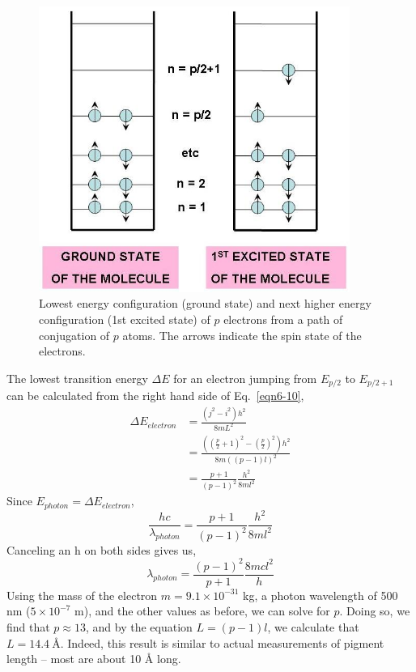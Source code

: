 \begin{figure}[h]
	\centering
	\includegraphics[width=4.0in]{./figures/Topic6/Fig6-6.jpg}
	\caption{Lowest energy configuration (ground state) and next higher energy configuration (1st excited state) of $p$ electrons from a path of conjugation of $p$ atoms. The arrows indicate the spin state of the electrons.}
	\label{Fig6-6}
\end{figure}

The lowest transition energy $\Delta E$ for an electron jumping from $E_{p/2}$ to $E_{p/2+1}$ can be calculated from the right hand side of Eq.~\ref{eqn6-10},      
\begin{align}
\Delta E_{electron}&=\frac{\left(j^2-i^2\right)h^2}{8mL^2}\nonumber\\
				&=\frac{\left(\left(\frac{p}{2}+1\right)^2-\left(\frac{p}{2}\right)^2\right)h^2}{8m\left(\left(p-1\right)l\right)^2}\nonumber\\
				&=\frac{p+1}{\left(p-1\right)^2}\frac{h^2}{8ml^2}\nonumber
\end{align}
Since $E_{photon} = \Delta E_{electron}$, 
$$\frac{hc}{\lambda_{photon}}=\frac{p+1}{\left(p-1\right)^2}\frac{h^2}{8ml^2}$$
Canceling an h on both sides gives us,
\begin{equation}\label{eqn6-11}
\lambda_{photon}=\frac{\left(p-1\right)^2}{p+1}\frac{8mcl^2}{h}
\end{equation}
Using the mass of the electron $m = 9.1\times10^{-31}$ kg, a photon wavelength of 500 nm ($5\times10^{-7}$ m), and the other values as before, we can solve for $p$.  Doing so, we find that $p\approx 13$, and by the equation $L = (p-1)l$, we calculate that $L=14.4~\text{\AA}$.  Indeed, this result is similar to actual measurements of pigment length -- most are about 10 $\text{\AA}$ long.

